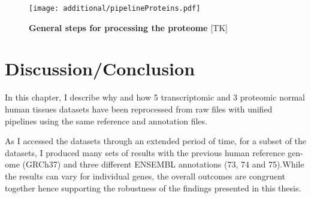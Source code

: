   \begin{figure}
      \texttt{[image: additional/pipelineProteins.pdf]}\centering
      \caption[General steps for processing the proteome
      data]{\label{fig:pipelineProt}\textbf{General steps for processing the
      proteome} [TK] }
  \end{figure}

\section{Discussion/Conclusion}

In this chapter, I describe why and how 5 transcriptomic and 3 proteomic normal
human tissues datasets have been reprocessed from raw files with unified
pipelines using the same reference and annotation files.

As I accessed the datasets through an extended period of time, for a subset of the datasets, I produced many sets of results with the previous human reference gen- ome (GRCh37) and three different ENSEMBL annotations (73, 74 and 75).While the results can vary for individual genes, the overall outcomes are congruent together hence supporting the robustness of the findings presented in this thesis.



